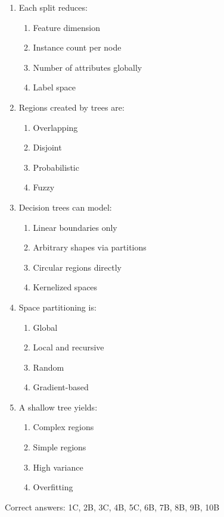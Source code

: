 \documentclass[3pt]{article}
\begin{document}
\begin{enumerate}
		\item Each split reduces:
		\begin{enumerate}
			\item Feature dimension
			\item Instance count per node
			\item Number of attributes globally
			\item Label space
		\end{enumerate}
		
		\item Regions created by trees are:
		\begin{enumerate}
			\item Overlapping
			\item Disjoint
			\item Probabilistic
			\item Fuzzy
		\end{enumerate}
		
		\item Decision trees can model:
		\begin{enumerate}
			\item Linear boundaries only
			\item Arbitrary shapes via partitions
			\item Circular regions directly
			\item Kernelized spaces
		\end{enumerate}
		
		\item Space partitioning is:
		\begin{enumerate}
			\item Global
			\item Local and recursive
			\item Random
			\item Gradient-based
		\end{enumerate}
		
		\item A shallow tree yields:
		\begin{enumerate}
			\item Complex regions
			\item Simple regions
			\item High variance
			\item Overfitting
		\end{enumerate}
	\end{enumerate}
	
	Correct answers: 1C, 2B, 3C, 4B, 5C, 6B, 7B, 8B, 9B, 10B
	
\end{document}
